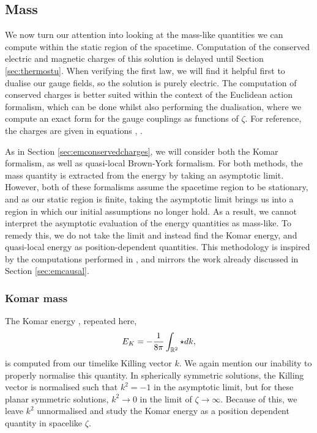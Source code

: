 \subsection{Mass}
\label{sec:stumass}
We now turn our attention into looking at the mass-like quantities we can compute within the static region of the spacetime. Computation of the conserved electric and magnetic charges of this solution is delayed until Section \ref{sec:thermostu}. When verifying the first law, we will find it helpful first to dualise our gauge fields, so the solution is purely electric. The computation of conserved charges is better suited within the context of the Euclidean action formalism, which can be done whilst also performing the dualisation, where we compute an exact form for the gauge couplings as functions of $\zeta$. For reference, the charges are given in equations , .

As in Section \ref{sec:emconservedcharges}, we will consider both the Komar formalism, as well as quasi-local Brown-York formalism. For both methods, the mass quantity is extracted from the energy by taking an asymptotic limit. However, both of these formalisms assume the spacetime region to be stationary, and as our static region is finite, taking the asymptotic limit brings us into a region in which our initial assumptions no longer hold. As a result, we cannot interpret the asymptotic evaluation of the energy quantities as mass-like. To remedy this, we do not take the limit and instead find the Komar energy, and quasi-local energy as position-dependent quantities. This methodology is inspired by the computations performed in \cite{Burgess:2002vu, Burgess:2003mk}, and mirrors the work already discussed in Section \ref{sec:emcausal}. 

\subsubsection*{Komar mass}

The Komar energy , repeated here,
\begin{equation*}
	E_{K} = - \frac{1}{8\pi} \int_{{\mathbb{R}}^2} \star dk ,
\end{equation*}
is computed from our timelike Killing vector $k$. We again mention our inability to properly normalise this quantity. In spherically symmetric solutions, the Killing vector is normalised such that $k^2 = -1$ in the asymptotic limit, but for these planar symmetric solutions, $k^2 \rightarrow 0$ in the limit of $\zeta \rightarrow \infty$. Because of this, we leave $k^2$ unnormalised and study the Komar energy as a position dependent quantity in spacelike $\zeta$.

